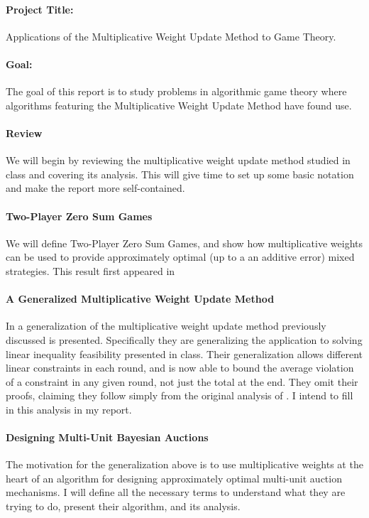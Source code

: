 \documentclass[letterpaper,12pt,oneside,onecolumn]{article}
\begin{document}
\paragraph{Project Title:} Applications of the Multiplicative Weight Update Method to Game Theory.
\paragraph{Goal:} The goal of this report is to study problems in algorithmic game theory where algorithms featuring the Multiplicative Weight Update Method have found use.
\paragraph{Review}
We will begin by reviewing the multiplicative weight update method studied in class \cite{arora2012multiplicative} and covering its analysis. This will give time to set up some basic notation and make the report more self-contained.
\paragraph{Two-Player Zero Sum Games} We will define Two-Player Zero Sum Games, and show how multiplicative weights can be used to provide approximately optimal (up to a an additive error) mixed strategies. This result first appeared in \cite{freund1999adaptive}
\paragraph{A Generalized Multiplicative Weight Update Method}
In \cite{bhalgat2013optimal} a generalization of the multiplicative weight update method previously discussed is presented. Specifically they are generalizing the application to solving linear inequality feasibility presented in class. Their generalization allows different linear constraints in each round, and is now able to bound the average violation of a constraint in any given round, not just the total at the end. They omit their proofs, claiming they follow simply from the original analysis of \cite{arora2012multiplicative}. I intend to fill in this analysis in my report.
\paragraph{Designing Multi-Unit Bayesian Auctions}
The motivation for the generalization above \cite{bhalgat2013optimal} is to use multiplicative weights at the heart of an algorithm for designing approximately optimal multi-unit auction mechanisms. I will define all the necessary terms to understand what they are trying to do, present their algorithm, and its analysis.
\end{document}

